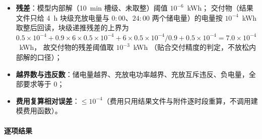 \begin{itemize}
  \item \textbf{残差}：模型内部解（10~min 槽级、未取整）阈值 $10^{-6}$~kWh；
        交付物（结果文件只给 4~h 块级充放电量与 $0{:}00$、$24{:}00$ 两个储电量）的电量按
        $10^{-4}$~kWh 取整后回读，块级递推残差的上界为
        $0.5\times10^{-4}+0.9\times6\times0.5\times10^{-4}+6\times0.5\times10^{-4}/0.9+0.5\times10^{-4}=7.0\times10^{-4}$~kWh，
        故交付物的残差阈值取 $10^{-3}$~kWh
        （贴合交付精度的判定，不放松内部解的口径）；
  \item \textbf{越界数与违反数}：储电量越界、充放电功率越界、充放互斥违反、负电量，全部要求等于 $0$；
  \item \textbf{费用复算相对误差}：$\le10^{-4}$（费用只用结果文件与附件逐时段重算，不调用建模费用函数）。
\end{itemize}

\paragraph{逐项结果}

